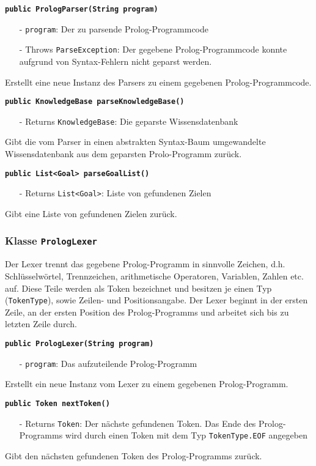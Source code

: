 \documentclass[parskip=full,11pt,twoside]{scrartcl}
\begin{document}
\textbf{\texttt{public PrologParser(String program)}}
\begin{itemize}[noitemsep]
	\item[-] \texttt{program}: Der zu parsende Prolog-Programmcode
	\item[-] Throws \texttt{ParseException}: Der gegebene Prolog-Programmcode konnte aufgrund von Syntax-Fehlern nicht geparst werden.
\end{itemize}
Erstellt eine neue Instanz des Parsers zu einem gegebenen Prolog-Programmcode.

\textbf{\texttt{public KnowledgeBase parseKnowledgeBase()}}
\begin{itemize}[noitemsep]
	\item[-] Returns \texttt{KnowledgeBase}: Die geparste Wissensdatenbank
\end{itemize}
Gibt die vom Parser in einen abstrakten Syntax-Baum umgewandelte Wissensdatenbank aus dem geparsten Prolo-Programm zurück.

\textbf{\texttt{public List<Goal> parseGoalList()}}
\begin{itemize}[noitemsep]
	\item[-] Returns \texttt{List<Goal>}: Liste von gefundenen Zielen
\end{itemize}
Gibt eine Liste von gefundenen Zielen zurück.

\subsubsection{Klasse \texttt{PrologLexer}}

Der Lexer trennt das gegebene Prolog-Programm in sinnvolle Zeichen, d.h. Schlüsselwörtel, Trennzeichen, arithmetische Operatoren, Variablen, Zahlen etc. auf. Diese Teile werden als Token bezeichnet und besitzen je einen Typ (\texttt{TokenType}), sowie Zeilen- und Positionsangabe. Der Lexer beginnt in der ersten Zeile, an der ersten Position des Prolog-Programms und arbeitet sich bis zu letzten Zeile durch.

\textbf{\texttt{public PrologLexer(String program)}}
\begin{itemize}[noitemsep]
	\item[-] \texttt{program}: Das aufzuteilende Prolog-Programm
\end{itemize}
Erstellt ein neue Instanz vom Lexer zu einem gegebenen Prolog-Programm.

\textbf{\texttt{public Token nextToken()}}
\begin{itemize}[noitemsep]
	\item[-] Returns \texttt{Token}: Der nächste gefundenen Token. Das Ende des Prolog-Programms wird durch einen Token mit dem Typ \texttt{TokenType.EOF} angegeben
\end{itemize}
Gibt den nächsten gefundenen Token des Prolog-Programms zurück.
\end{document}
